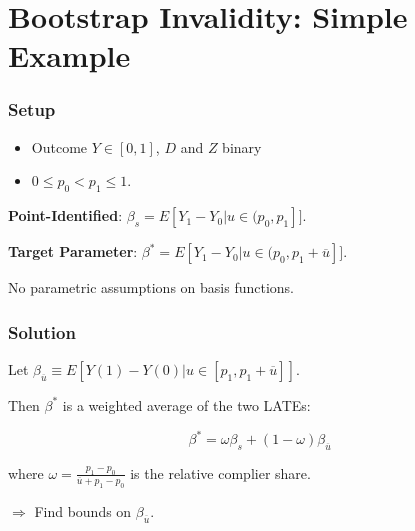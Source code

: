 \documentclass[11pt, aspectratio=169]{beamer}
\begin{document}
\section{Bootstrap Invalidity: Simple Example}

\begin{frame}
    \frametitle{Setup}

    \begin{itemize}
        \item Outcome $Y \in [0,1]$, $D$ and $Z$ binary
        \item $0 \leq p_0 < p_1 \leq 1$.
    \end{itemize}

    \vspace{0.5cm}

    \textbf{Point-Identified}: $\beta_s = E[Y_1 - Y_0 | u \in (p_0, p_1]]$.

    \vspace{0.5cm}

    \textbf{Target Parameter}: $\beta^* = E[Y_1 - Y_0 | u \in (p_0, p_1 + \overline{u}]]$.

    \vspace{0.5cm}

    No parametric assumptions on basis functions.

\end{frame}

\begin{frame}
    \frametitle{Solution}

    Let $\beta_{\overline{u}} \equiv E[Y(1) - Y(0) | u \in [p_1, p_1 + \overline{u}]]$.

    \vspace{0.5cm}

    Then $\beta^*$ is a weighted average of the two LATEs:\@

    \begin{equation*}
        \beta^* = \omega\beta_s + (1-\omega)\beta_{\overline{u}}
    \end{equation*}

    where $\omega = \frac{p_1 - p_0}{\overline{u} + p_1 - p_0}$ is the relative complier share.

    \vspace{0.5cm}

    $\Rightarrow$ Find bounds on $\beta_{\overline{u}}$.

\end{frame}
\end{document}
